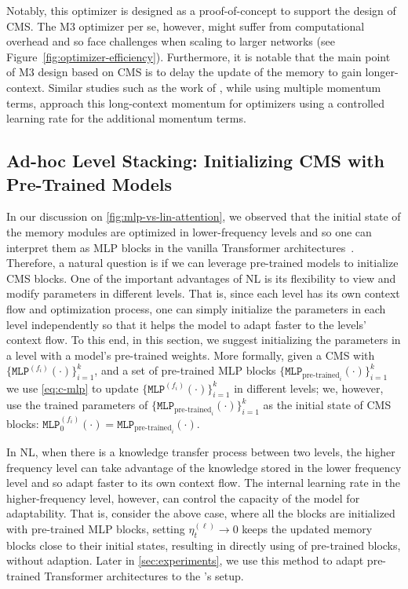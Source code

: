 {Notably, this optimizer is designed as a proof-of-concept to support the design of CMS. The M3 optimizer per se, however, might suffer from computational overhead and so face challenges when scaling to larger networks (see Figure~\ref{fig:optimizer-efficiency}). Furthermore, it is notable that the main point of M3 design based on CMS is to delay the update of the memory to gain longer-context. Similar studies such as the work of \citet{pagliardini2025the, ueaj2025multiscalemuon}, while using multiple momentum terms, approach this long-context momentum for optimizers using a controlled learning rate for the additional momentum terms.   




\subsection{Ad-hoc Level Stacking: Initializing CMS with Pre-Trained Models}\label{sec:pre-trained-mlp} 
In our discussion on \autoref{fig:mlp-vs-lin-attention}, we observed that the initial state of the memory modules are optimized in lower-frequency levels and so one can interpret them as MLP blocks in the vanilla Transformer architectures~\citep{transformers}. Therefore, a natural question is if we can leverage pre-trained models to initialize CMS blocks. One of the important advantages of NL is its flexibility to view and modify parameters in different levels. That is, since each level has its own context flow and optimization process, one can simply initialize the parameters in each level independently so that it helps the model to adapt faster to the levels' context flow. To this end, in this section, we suggest initializing the parameters in a level with a model's pre-trained weights. More formally, given a CMS with $\{\texttt{MLP}^{(f_i)}(\cdot)\}_{i = 1}^{k}$, and a set of pre-trained MLP blocks $\{\texttt{MLP}_{\text{pre-trained}_i}(\cdot)\}_{i=1}^{k}$ we use \autoref{eq:c-mlp} to update $\{\texttt{MLP}^{(f_i)}(\cdot)\}_{i = 1}^{k}$ in different levels; we, however, use the trained parameters of $\{\texttt{MLP}_{\text{pre-trained}_i}(\cdot)\}_{i=1}^{k}$ as the initial state of CMS blocks: $\texttt{MLP}^{(f_i)}_0(\cdot) = \texttt{MLP}_{\text{pre-trained}_i}(\cdot)$. 


 In NL, when there is a knowledge transfer process between two levels, the higher frequency level can take advantage of the knowledge stored in the lower frequency level and so adapt faster to its own context flow. The internal learning rate in the higher-frequency level, however, can control the capacity of the model for adaptability. That is, consider the above case, where all the blocks are initialized with pre-trained MLP blocks, setting $\eta_t^{(\ell)} \rightarrow 0$ keeps the updated memory blocks close to their initial states, resulting in directly using of pre-trained blocks, without adaption. Later in \autoref{sec:experiments}, we use this method to adapt pre-trained Transformer architectures to the \model's setup.    




}
